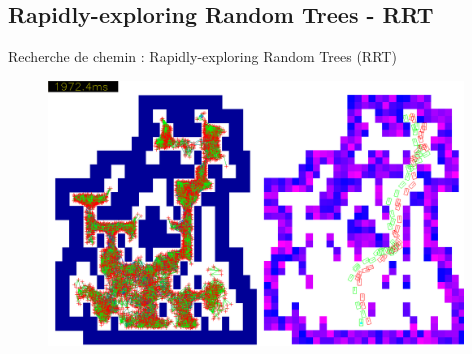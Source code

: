 \documentclass{beamer}
\begin{document}
\subsection{Rapidly-exploring Random Trees - RRT}
\begin{frame}
  \center Recherche de chemin : Rapidly-exploring Random Trees (RRT)
  \begin{figure}
    \includegraphics[width=11cm]{./images/RRT.png}
  \end{figure}
\end{frame}
\end{document}
